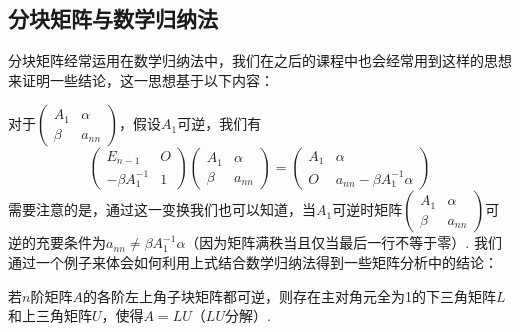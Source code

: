 \subsection{分块矩阵与数学归纳法}

分块矩阵经常运用在数学归纳法中，我们在之后的课程中也会经常用到这样的思想来证明一些结论，这一思想基于以下内容：

对于$\begin{pmatrix}
        A_1 & \alpha \\ \beta & a_{nn}
    \end{pmatrix}$，假设$A_1$可逆，我们有
\[\begin{pmatrix}
        E_{n-1} & O \\ -\beta A_1^{-1} & 1
    \end{pmatrix}\begin{pmatrix}
        A_1 & \alpha \\ \beta & a_{nn}
    \end{pmatrix}=\begin{pmatrix}
        A_1 & \alpha \\ O & a_{nn}-\beta A_1^{-1}\alpha
    \end{pmatrix}\]
需要注意的是，通过这一变换我们也可以知道，当$A_1$可逆时矩阵$\begin{pmatrix}
        A_1 & \alpha \\ \beta & a_{nn}
    \end{pmatrix}$可逆的充要条件为$a_{nn}\neq \beta A_1^{-1}\alpha$（因为矩阵满秩当且仅当最后一行不等于零）. 我们通过一个例子来体会如何利用上式结合数学归纳法得到一些矩阵分析中的结论：
\begin{example}{}{}
    若$n$阶矩阵$A$的各阶左上角子块矩阵都可逆，则存在主对角元全为1的下三角矩阵$L$和上三角矩阵$U$，使得$A=LU$（$LU$分解）.
\end{example}

